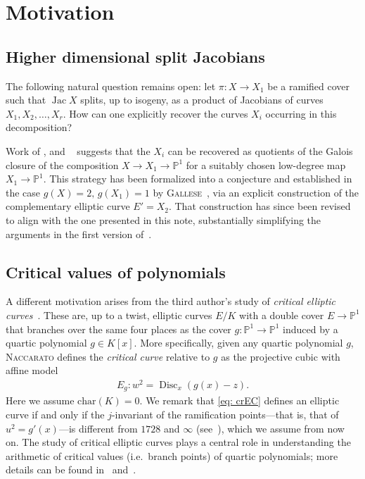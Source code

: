 \documentclass[a4paper,twoside,english]{amsart}
\theoremstyle{plain}
\theoremstyle{definition}
\begin{document}
\section{Motivation}
\subsection{Higher dimensional split Jacobians}
The following natural question remains open: let $\pi \colon X \to X_1$ be a ramified cover such that $\operatorname{Jac} X$ splits, up to isogeny, as a product of Jacobians of curves $X_1, X_2, \ldots, X_r$. How can one explicitly recover the curves $X_i$ occurring in this decomposition?


Work of {}, and {}~\cite{MR4574430} suggests 
that the $X_i$ can be recovered as quotients of the Galois closure of the composition $X \to X_1 \to \mathbb{P}^1$ for a suitably chosen low-degree map $X_1 \to \mathbb{P}^1$. This strategy has been formalized into a conjecture and established 
in the case $g(X)=2,\, g(X_1)=1$ by \textsc{Gallese}~\cite{gallese}, via an explicit construction 
of the complementary elliptic curve $E' = X_2$. That construction has since been revised to align 
with the one presented in this note, substantially simplifying the arguments in the first version of~\cite{gallese}. 

\subsection{Critical values of polynomials}\label{subs: cv}

A different motivation arises from the third author's study of \textit{critical elliptic curves}~\cite[\S 2]{nac2}. These are, up to a twist, elliptic curves $E/K$ with a double cover $E\to\mathbb P^1$ that branches over the same four places as the cover $g:\mathbb P^1\to\mathbb  P^1$ induced by a quartic polynomial $g\in K[x]$. More specifically, given any quartic polynomial $g$, \textsc{Naccarato} defines the \textit{critical curve} relative to $g$ as the projective cubic with affine model
\begin{align}
 E_g: w^2=\operatorname{Disc}_x(g(x)-z).\label{eq: crEC}
 \end{align}
Here we assume $\mathrm{char}(K)=0$. We remark that \eqref{eq: crEC} defines an elliptic curve if and only if the $j$-invariant of the ramification points---that is, that of $u^2=g'(x)$---is different from $1728$ and $\infty$ (see~\cite[\S 4.2]{nac1}), which we assume from now on. The study of critical elliptic curves plays a central role in understanding the arithmetic of critical values (i.e.~branch points) of quartic polynomials; more details can be found in~\cite[\S 5]{nac1} and~\cite{nac2}.
\end{document}
